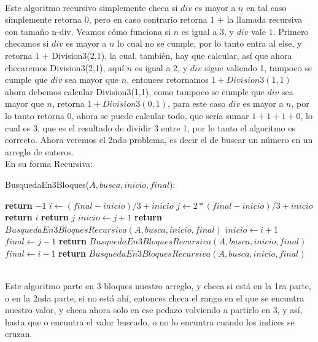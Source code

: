 \documentclass[12pt,twoside]{article}
\begin{document}
\\ Este algoritmo recursivo simplemente checa si $div$ es mayor a $n$ en tal caso simplemente retorna 0, pero en caso contrario retorna 1 + la llamada recursiva con tamaño n-div. Veamos cómo funciona si $n$ es igual a 3, y $div$ vale 1. Primero checamos si $div$ es mayor a $n$ lo cual no se cumple, por lo tanto entra al else, y retorna 1 + Division3(2,1), la cual, también, hay que calcular, así que ahora checaremos Division3(2,1), aquí $n$ es igual a 2, y $div$ sigue valiendo 1, tampoco se cumple que $div$ sea mayor que $n$, entonces retornamos $1+Division3(1,1)$ ahora debemos calcular Division3(1,1), como tampoco se cumple que $div$ sea mayor que $n$, retorna $1+Division3(0,1)$, para este caso $div$ es mayor a $n$, por lo tanto retorna 0, ahora se puede calcular todo, que sería sumar $1+1+1+0$, lo cual es 3, que es el resultado de dividir 3 entre 1, por lo tanto el algoritmo es correcto. 
\newpage
Ahora veremos el 2ndo problema, es decir el de buscar un número en un arreglo de enteros.
\\ En su forma Recursiva:
\begin{algorithm}
    \caption{BusquedaEn3Bloques($A,busca,inicio,final$):}
    \begin{algorithmic}
            \State \textbf{return} $-1$
        \Else
            \State $i \gets (final-inicio)/3+inicio$
            \State $j \gets 2*(final-inicio)/3+inicio$
                \State \textbf{return} $i$
                \State \textbf{return} $j$
                \State $inicio \gets j + 1$
                \State \textbf{return} $BusquedaEn3BloquesRecursiva(A, busca, inicio, final)$
                \State $inicio \gets i + 1$
                \State $final \gets j - 1$
                \State \textbf{return} $BusquedaEn3BloquesRecursiva(A, busca, inicio, final)$
            \Else
                \State $final \gets i - 1$
                \State \textbf{return} $BusquedaEn3BloquesRecursiva(A, busca, inicio, final)$
            \EndIf
        \EndIf 
    \end{algorithmic}
\end{algorithm}
\\ Este algoritmo parte en 3 bloques nuestro arreglo, y checa si está en la 1ra parte, o en la 2nda parte, si no está ahí, entonces checa el rango en el que se encuntra nuestro valor, y checa ahora solo en ese pedazo volviendo a partirlo en 3, y así, hasta que o encuntra el valor buscado, o no lo encuntra cuando los indices se cruzan.
\end{document}
